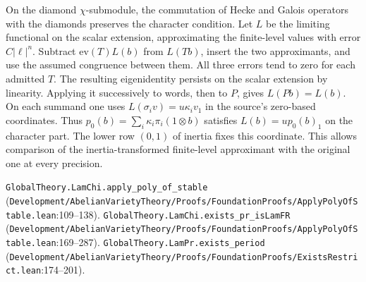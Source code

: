 On the diamond $\chi$-submodule, the commutation of Hecke and Galois operators with the diamonds preserves the character condition. Let $L$ be the limiting functional on the scalar extension, approximating the finite-level values with error $C|\ell|^n$. Subtract $\mathrm{ev}(T)L(b)$ from $L(Tb)$, insert the two approximants, and use the assumed congruence between them. All three errors tend to zero for each admitted $T$. The resulting eigenidentity persists on the scalar extension by linearity. Applying it successively to words, then to $P$, gives $L(Pb)=L(b)$. On each summand one uses $L(\sigma_i v)=u\kappa_i v_1$ in the source's zero-based coordinates. Thus $p_0(b)=\sum_i\kappa_i\pi_i(1\otimes b)$ satisfies $L(b)=u p_0(b)_1$ on the character part. The lower row $(0,1)$ of inertia fixes this coordinate. This allows comparison of the inertia-transformed finite-level approximant with the original one at every precision.
\par{\footnotesize \nolinkurl{GlobalTheory.LamChi.apply_poly_of_stable} (\nolinkurl{Development/AbelianVarietyTheory/Proofs/FoundationProofs/ApplyPolyOfStable.lean}\allowbreak:109--138). \nolinkurl{GlobalTheory.LamChi.exists_pr_isLamFR} (\nolinkurl{Development/AbelianVarietyTheory/Proofs/FoundationProofs/ApplyPolyOfStable.lean}\allowbreak:169--287). \nolinkurl{GlobalTheory.LamPr.exists_period} (\nolinkurl{Development/AbelianVarietyTheory/Proofs/FoundationProofs/ExistsRestrict.lean}\allowbreak:174--201).\par}

